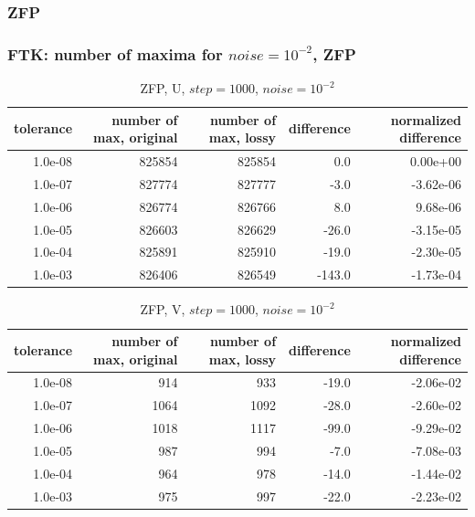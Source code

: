 \subsubsection{ZFP}
\begin{frame}[fragile]
  \frametitle{FTK: number of maxima for $noise = 10^{-2}$, ZFP }

  {\tiny
    \begin{table}[H]
      \centering
      \begin{tabular}{|r|r|r|r|r|}
        \hline
        tolerance &         number of max, original &         number of max, lossy &       difference & normalized difference \\
        \hline
        1.0e-08 &           825854 &        825854 &             0.0 &       0.00e+00 \\
        \hline
        1.0e-07 &           827774 &        827777 &            -3.0 &      -3.62e-06 \\
        \hline
        1.0e-06 &           826774 &        826766 &             8.0 &       9.68e-06 \\
        \hline
        1.0e-05 &           826603 &        826629 &           -26.0 &      -3.15e-05 \\
        \hline
        1.0e-04 &           825891 &        825910 &           -19.0 &      -2.30e-05 \\
        \hline
        1.0e-03 &           826406 &        826549 &          -143.0 &      -1.73e-04 \\
        \hline
      \end{tabular}
      \caption{ZFP, U, $step = 1000$, $noise = 10^{-2}$}
      \label{zfp_u_table}
    \end{table} 
  }

  {\tiny
    \begin{table}[H]
      \centering
      \begin{tabular}{|r|r|r|r|r|}
        \hline
        tolerance &         number of max, original &         number of max, lossy &       difference & normalized difference \\
        \hline
        
        1.0e-08 &              914 &           933 &           -19.0 &      -2.06e-02 \\
        \hline
        1.0e-07 &             1064 &          1092 &           -28.0 &      -2.60e-02 \\
        \hline
        1.0e-06 &             1018 &          1117 &           -99.0 &      -9.29e-02 \\
        \hline
        1.0e-05 &              987 &           994 &            -7.0 &      -7.08e-03 \\
        \hline
        1.0e-04 &              964 &           978 &           -14.0 &      -1.44e-02 \\
        \hline
        1.0e-03 &              975 &           997 &           -22.0 &      -2.23e-02 \\
        \hline
      \end{tabular}
      \caption{ZFP, V, $step = 1000$, $noise = 10^{-2}$}
      \label{zfp_v_table}
    \end{table}
  }


\end{frame}
